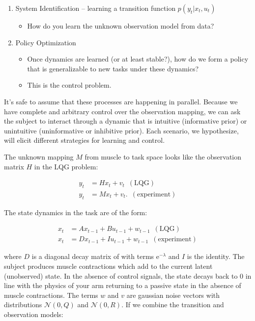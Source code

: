 \documentclass[
  a4paper,
]{article}
\providecommand{\tightlist}{%
  \setlength{\itemsep}{0pt}\setlength{\parskip}{0pt}}
\begin{document}
\begin{enumerate}
\def\labelenumi{\arabic{enumi}.}
\tightlist
\item
  System Identification -- learning a transition function
  \(p(y_t|x_t, u_t)\)

  \begin{itemize}
  \tightlist
  \item
    How do you learn the unknown observation model from data?
  \end{itemize}
\item
  Policy Optimization

  \begin{itemize}
  \tightlist
  \item
    Once dynamics are learned (or at least stable?), how do we form a
    policy that is generalizable to new tasks under these dynamics?
  \item
    This is the control problem.
  \end{itemize}
\end{enumerate}

It's safe to assume that these processes are happening in parallel.
Because we have complete and arbitrary control over the observation
mapping, we can ask the subject to interact through a dynamic that is
intuitive (informative prior) or unintuitive (uninformative or
inhibitive prior). Each scenario, we hypothesize, will elicit different
strategies for learning and control.

The unknown mapping \(M\) from muscle to task space looks like the
observation matrix \(H\) in the LQG problem:

\begin{align*}
y_t &= Hx_t + v_t\,\,\,(\mathrm{LQG}) \\
y_t &= Mx_t + v_t. \,\,\,(\mathrm{experiment})
\end{align*}

The state dynamics in the task are of the form:

\begin{align*}
x_{t} &= Ax_{t-1} + Bu_{t-1} + w_{t-1} \,\,\,(\mathrm{LQG}) \\
x_t &= Dx_{t-1} + Iu_{t-1} + w_{t-1} \,\,\,(\mathrm{experiment})
\end{align*}

where \(D\) is a diagonal decay matrix of with terms
\(\mathrm{e}^{-\lambda}\) and \(I\) is the identity. The subject
produces muscle contractions which add to the current latent
(unobserved) state. In the absence of control signals, the state decays
back to \(0\) in line with the physics of your arm returning to a
passive state in the absence of muscle contractions. The terms \(w\) and
\(v\) are gaussian noise vectors with distributions \(\mathcal{N}(0,Q)\)
and \(\mathcal{N}(0,R)\). If we combine the transition and observation
models:
\end{document}
